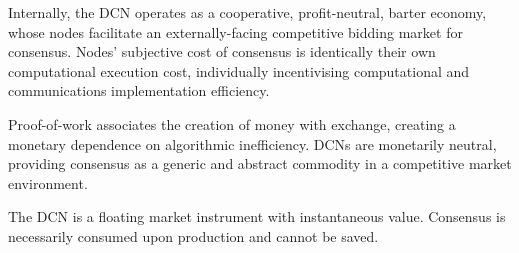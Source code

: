 Internally, the DCN operates as a cooperative, profit-neutral, barter economy, whose nodes facilitate an externally-facing competitive bidding market for consensus. Nodes' subjective cost of consensus is identically their own computational execution cost, individually incentivising computational and communications implementation efficiency.

Proof-of-work associates the creation of money with exchange, creating a monetary dependence on algorithmic inefficiency. DCNs are monetarily neutral, providing consensus as a generic and abstract commodity in a competitive market environment.

The DCN is a floating market instrument with instantaneous value. Consensus is necessarily consumed upon production and cannot be saved.









